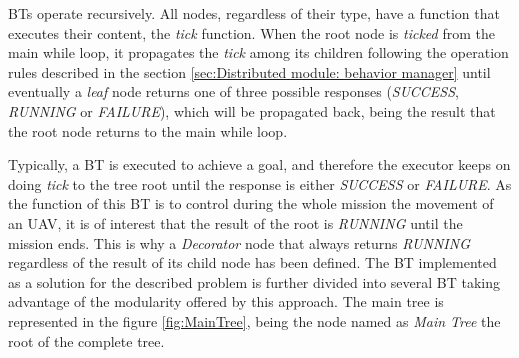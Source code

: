 \glspl{BT} operate recursively. All nodes, regardless of their type, have a function that executes their content, the \emph{tick} function. When the root node is \emph{ticked} from the main while loop, it propagates the \emph{tick} among its children following the operation rules described in the section \ref{sec:Distributed module: behavior manager} until eventually a \emph{leaf} node returns one of three possible responses (\emph{SUCCESS}, \emph{RUNNING} or \emph{FAILURE}), which will be propagated back, being the result that the root node returns to the main while loop. 

Typically, a \gls{BT} is executed to achieve a goal, and therefore the executor keeps on doing \emph{tick} to the tree root until the response is either \emph{SUCCESS} or \emph{FAILURE}. As the function of this \gls{BT} is to control during the whole mission the movement of an \gls{UAV}, it is of interest that the result of the root is \emph{RUNNING} until the mission ends. This is why a \emph{Decorator} node that always returns \emph{RUNNING} regardless of the result of its child node has been defined. The \gls{BT} implemented as a solution for the described problem is further divided into several \gls{BT} taking advantage of the modularity offered by this approach. The main tree is represented in the figure \ref{fig:MainTree}, being the node named as \emph{Main Tree} the root of the complete tree.

